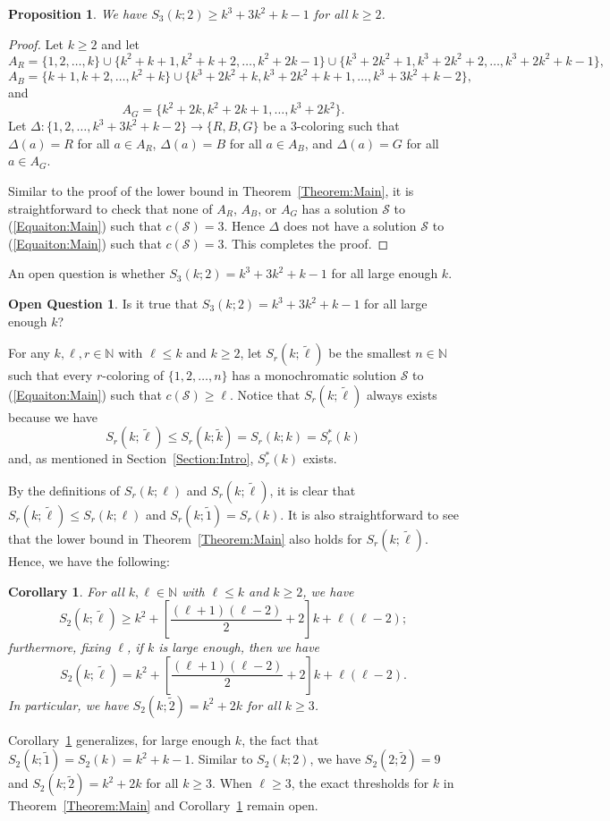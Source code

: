 \documentclass[11pt]{article}
\newtheorem{corollary}[theorem]{Corollary}
\newtheorem{proposition}[theorem]{Proposition}
\theoremstyle{definition}
\newtheorem{problem}[theorem]{Open Question}
\begin{document}
\begin{proposition}
We have $S_3(k;2)\geq k^3+3k^2+k-1$ for all $k\geq2$.
\end{proposition}
\begin{proof}
Let $k\geq2$ and let
\[
A_R=\{1,2,\ldots,k\}\cup\{k^2+k+1,k^2+k+2,\ldots,k^2+2k-1\}\cup\{k^3+2k^2+1,k^3+2k^2+2,\ldots,k^3+2k^2+k-1\},
\]
\[
A_B=\{k+1,k+2,\ldots,k^2+k\}\cup\{k^3+2k^2+k,k^3+2k^2+k+1,\ldots,k^3+3k^2+k-2\},
\]
and
\[
A_G=\{k^2+2k,k^2+2k+1,\ldots,k^3+2k^2\}.
\]
Let $\Delta:\{1,2,\ldots,k^3+3k^2+k-2\}\to\{R,B,G\}$ be a $3$-coloring such that $\Delta(a)=R$ for all $a\in A_R$, $\Delta(a)=B$ for all $a\in A_B$, and $\Delta(a)=G$ for all $a\in A_G$.

Similar to the proof of the lower bound in Theorem~\ref{Theorem:Main}, it is straightforward to check that none of $A_R$, $A_B$, or $A_G$ has a solution $\mathcal{S}$ to (\ref{Equaiton:Main}) such that $c(\mathcal{S})=3$. Hence $\Delta$ does not have a solution $\mathcal{S}$ to (\ref{Equaiton:Main}) such that $c(\mathcal{S})=3$. This completes the proof.
\end{proof}

An open question is whether $S_3(k;2)= k^3+3k^2+k-1$ for all large enough $k$.
\begin{problem}
Is it true that $S_3(k;2)= k^3+3k^2+k-1$ for all large enough $k$?
\end{problem}

For any $k,\ell,r\in\mathbb{N}$ with $\ell\leq k$ and $k\geq2$, let $S_r(k;\tilde{\ell})$ be the smallest $n\in\mathbb{N}$ such that every $r$-coloring of $\{1,2,\ldots,n\}$ has a monochromatic solution $\mathcal{S}$ to (\ref{Equaiton:Main}) such that $c(\mathcal{S})\geq\ell$. Notice that $S_r(k;\tilde{\ell})$ always exists because we have
\[
S_r(k;\tilde{\ell})\leq S_r(k;\tilde{k})=S_r(k;k)=S_r^*(k)
\]
and, as mentioned in Section~\ref{Section:Intro}, $S_r^*(k)$ exists. 

By the definitions of $S_r(k;\ell)$ and $S_r(k;\tilde{\ell})$, it is clear that $S_r(k;\tilde{\ell})\leq S_r(k;\ell)$ and $S_r(k;\tilde{1})=S_r(k)$. It is also straightforward to see that the lower bound in Theorem~\ref{Theorem:Main} also holds for $S_r(k;\tilde{\ell})$. Hence, we have the following:

\begin{corollary}\label{Theorem:Corollary}
For all $k,\ell\in\mathbb{N}$ with $\ell\leq k$ and $k\geq2$, we have
    \[
    S_2(k;\tilde{\ell})\geq k^2+\left[\frac{(\ell+1)(\ell-2)}{2}+2\right]k+\ell(\ell-2);
    \]
furthermore, fixing $\ell$, if $k$ is large enough, then we have
 \[
    S_2(k;\tilde{\ell})= k^2+\left[\frac{(\ell+1)(\ell-2)}{2}+2\right]k+\ell(\ell-2).
    \]
In particular, we have $S_2(k;\tilde{2})=k^2+2k$ for all $k\geq3$.
\end{corollary}
Corollary~\ref{Theorem:Corollary} generalizes, for large enough $k$, the fact that $S_2(k;\tilde{1})=S_2(k)=k^2+k-1$. Similar to $S_2(k;2)$, we have $S_2(2;\tilde{2})=9$ and $S_2(k;\tilde{2})=k^2+2k$ for all $k\geq3$. When $\ell\geq3$, the exact thresholds for $k$ in Theorem~\ref{Theorem:Main} and Corollary~\ref{Theorem:Corollary} remain open.
\end{document}
